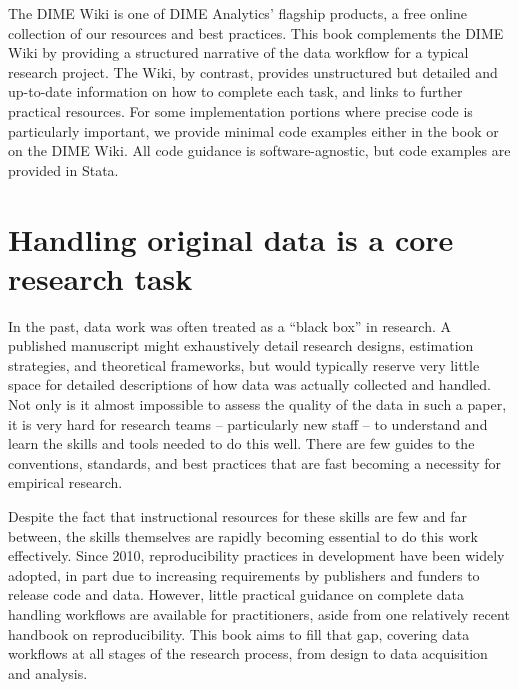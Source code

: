 The DIME Wiki is one of DIME Analytics' flagship products,
a free online collection of our resources and best practices.
This book complements the DIME Wiki by providing a structured narrative
of the data workflow for a typical research project.
The Wiki, by contrast, provides unstructured but detailed and up-to-date information
on how to complete each task, and links to further practical resources.
For some implementation portions where precise code is particularly important,
we provide minimal code examples either in the book or on the DIME Wiki.
All code guidance is software-agnostic, but code examples are provided in Stata.

\section{Handling original data is a core research task}

In the past, data work was often treated as a ``black box'' in research.
A published manuscript might exhaustively detail
research designs, estimation strategies, and theoretical frameworks,
but would typically reserve very little space for detailed descriptions
of how data was actually collected and handled.
Not only is it almost impossible to assess the quality of the data in such a paper,
it is very hard for research teams -- particularly new staff --
to understand and learn the skills and tools needed to do this well.
There are few guides to the conventions, standards, and best practices
that are fast becoming a necessity for empirical research.

Despite the fact that instructional resources for these skills are few and far between,
the skills themselves are rapidly becoming essential to do this work effectively.
Since 2010, reproducibility practices in development have been widely adopted,\cite{swanson2020research}
in part due to increasing requirements by publishers and funders to release code and data.
However, little practical guidance on complete data handling workflows are available for practitioners,
aside from one relatively recent handbook on reproducibility.\cite{christensen2019transparent}
This book aims to fill that gap,
covering data workflows at all stages of the research process,
from design to data acquisition and analysis.

